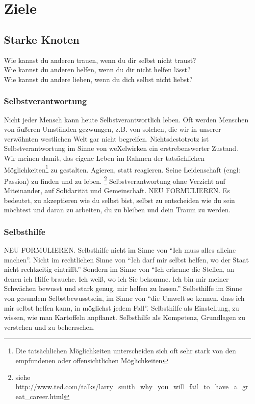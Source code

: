 \chapter{Ziele}
  \section{Starke Knoten}
Wie kannst du anderen trauen, wenn du dir selbst nicht traust?\\
Wie kannst du anderen helfen, wenn du dir nicht helfen lässt?\\
Wie kannst du andere lieben, wenn du dich selbst nicht liebst?\\
    \subsection{Selbstverantwortung}
Nicht jeder Mensch kann heute Selbstverantwortlich leben.
%
Oft werden Menschen von äußeren Umständen gezwungen, z.B. von solchen, die wir in unserer verwöhnten westlichen Welt gar nicht begreifen.
%
Nichtsdestotrotz ist Selbstverantwortung im Sinne von weXelwirken ein erstrebenswerter Zustand.
%
Wir meinen damit, das eigene Leben im Rahmen der tatsächlichen Möglichkeiten\footnote{Die tatsächlichen Möglichkeiten unterscheiden sich oft sehr stark von den empfundenen oder offensichtlichen Möglichkeiten} zu gestalten.
%
Agieren, statt reagieren.
%
Seine Leidenschaft (engl: Passion) zu finden und zu leben. \footnote{siehe http://www.ted.com/talks/larry\_smith\_why\_you\_will\_fail\_to\_have\_a\_great\_career.html} 
%
Selbstverantwortung ohne Verzicht auf Miteinander, auf Solidarität und Gemeinschaft.
%
NEU FORMULIEREN. Es bedeutet, zu akzeptieren wie du selbst bist, selbst zu entscheiden wie du sein möchtest und daran zu arbeiten, du zu bleiben und dein Traum zu werden.
    \subsection{Selbsthilfe}
NEU FORMULIEREN. Selbsthilfe nicht im Sinne von "`Ich muss alles alleine machen"'.
%
Nicht im rechtlichen Sinne von "`Ich darf mir selbst helfen, wo der Staat nicht rechtzeitig eintrifft."'
%
Sondern im Sinne von "`Ich erkenne die Stellen, an denen ich Hilfe brauche.
%
Ich weiß, wo ich Sie bekomme.
%
Ich bin mir meiner Schwächen bewusst und stark genug, mir helfen zu lassen."'
%
Selbsthilfe im Sinne von gesundem Selbstbewusstsein, im Sinne von "`die Umwelt so kennen, dass ich mir selbst helfen kann, in möglichst jedem Fall"'.
%
Selbsthilfe als Einstellung, zu wissen, wie man Kartoffeln anpflanzt.
%
Selbsthilfe als Kompetenz, Grundlagen zu verstehen und zu beherrschen.
